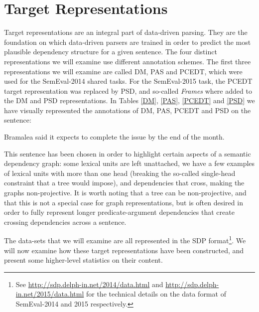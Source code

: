 \section{Target Representations}
\label{sec:representations}

Target representations are an integral part of data-driven parsing. They are the foundation on which data-driven parsers are trained in order to predict the most plausible dependency structure for a given sentence. The four distinct representations we will examine use different annotation schemes. The first three representations we will examine are called DM, PAS and PCEDT, which were used for the SemEval-2014 shared tasks. For the SemEval-2015 task, the PCEDT target representation was replaced by PSD, and so-called \textit{Frames} where added to the DM and PSD representations. In Tables \ref{DM}, \ref{PAS}, \ref{PCEDT} and \ref{PSD} we have visually represented the annotations of DM, PAS, PCEDT and PSD on the sentence:

\begin{displayquote}
Bramalea said it expects to complete the issue by the end of the month.
\end{displayquote}

This sentence has been chosen in order to highlight certain aspects of a semantic dependency graph: some lexical units are left unattached, we have a few examples of lexical units with more than one head (breaking the so-called single-head constraint that a tree would impose), and dependencies that cross, making the graphs non-projective. It is worth noting that a tree can be non-projective, and that this is not a special case for graph representations, but is often desired in order to fully represent longer predicate-argument dependencies that create crossing dependencies across a sentence.

The data-sets that we will examine are all represented in the SDP format\footnote{See \url{http://sdp.delph-in.net/2014/data.html} and \url{http://sdp.delph-in.net/2015/data.html} for the technical details on the data format of SemEval-2014 and 2015 respectively.}. We will now examine how these target representations have been constructed, and present some higher-level statistics on their content.


